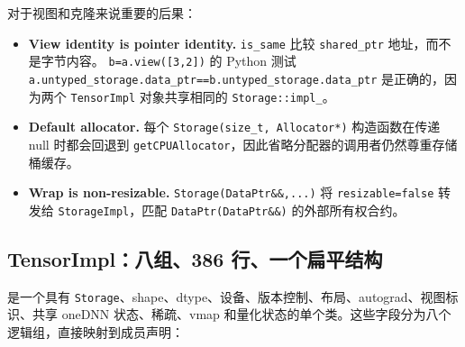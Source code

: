 对于视图和克隆来说重要的后果：

\begin{itemize}[leftmargin=1.2em]
\item \textbf{View identity is pointer identity.} \texttt{is\_same} 比较 \texttt{shared\_ptr} 地址，而不是字节内容。 \texttt{b=a.view([3,2])} 的 Python 测试 \texttt{a.untyped\_storage.data\_ptr==b.untyped\_storage.data\_ptr} 是正确的，因为两个 \texttt{TensorImpl} 对象共享相同的 \texttt{Storage::impl\_}。
\item \textbf{Default allocator.} 每个 \texttt{Storage(size\_t, Allocator*)} 构造函数在传递 null 时都会回退到 \texttt{getCPUAllocator}，因此省略分配器的调用者仍然尊重存储桶缓存。
\item \textbf{Wrap is non-resizable.} \texttt{Storage(DataPtr\&\&,...)} 将 \texttt{resizable=false} 转发给 \texttt{StorageImpl}，匹配 \texttt{DataPtr(DataPtr\&\&)} 的外部所有权合约。
\end{itemize}

\subsection{TensorImpl：八组、386 行、一个扁平结构}
\label{sec:tensorimpl}

是一个具有 \texttt{Storage}、shape、dtype、设备、版本控制、布局、autograd、视图标识、共享 oneDNN 状态、稀疏、vmap 和量化状态的单个类。这些字段分为八个逻辑组，直接映射到成员声明：

